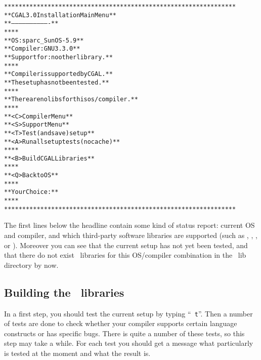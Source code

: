 {\ccTexHtml{\scriptsize}{} \label{pic:main-menu}
\begin{alltt}
  ****************************************************************
  **              CGAL 3.0 Installation Main Menu               **
  **              -------------------------------               **
  **                                                            **
  **   OS:                  sparc_SunOS-5.9                     **
  **   Compiler:            GNU 3.3.0                           **
  **   Support for:         no other library.                   **
  **                                                            **
  **   Compiler is supported by CGAL.                           **
  **   The setup has not been tested.                           **
  **                                                            **
  **   There are no libs for this os/compiler.                  **
  **                                                            **
  **   <C>  Compiler Menu                                       **
  **   <S>  Support Menu                                        **
  **   <T>  Test (and save) setup                               **
  **   <A>  Run all setup tests (no cache)                      **
  **                                                            **
  **   <B>  Build CGAL Libraries                                **
  **                                                            **
  **   <Q>  Back to OS                                          **
  **                                                            **
  **   Your Choice:                                             **
  **                                                            **
  ****************************************************************
\end{alltt}}

The first lines below the headline contain some kind of status report:
current OS and compiler, and which third-party software libraries are
supported (such as \gmp, \core, \leda, or \qt). Moreover you can see
that the current setup has not yet been tested, and that there do not
exist \cgal\ libraries for this OS/compiler combination in the \cgal\ 
lib directory by now.

\subsection{Building the \cgal\ libraries}\label{sec:test-the-setup}

In a first step, you should test the current setup by typing ``{\tt
  t}''. Then a number of tests are done to check whether your compiler
supports certain language constructs or has specific bugs. There is
quite a number of these tests, so this step may take a while. For each
test you should get a message what particularly is tested at the
moment and what the result is.

